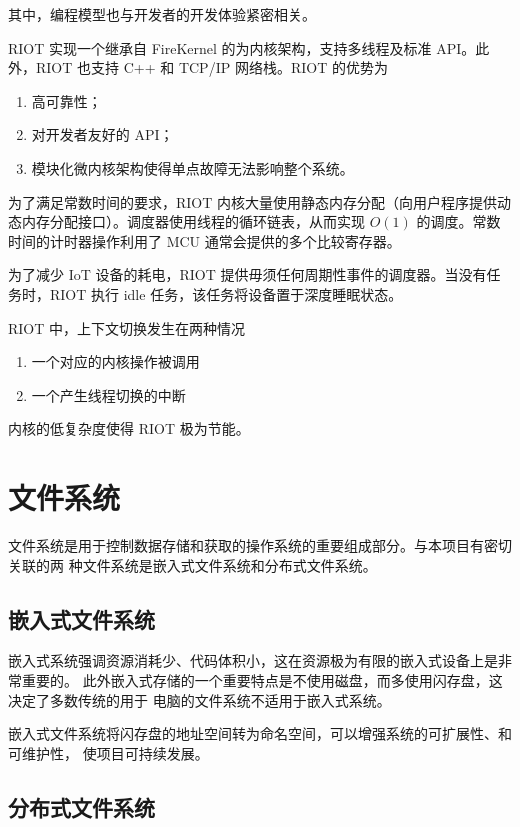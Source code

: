 \documentclass{ctexart}
\begin{document}
其中，编程模型也与开发者的开发体验紧密相关。

RIOT 实现一个继承自 FireKernel 的为内核架构，支持多线程及标准 API。此外，RIOT 也支持 C++ 和 TCP/IP 网络栈。RIOT 的优势为

\begin{enumerate}
	\item 高可靠性；
	\item 对开发者友好的 API；
	\item 模块化微内核架构使得单点故障无法影响整个系统。
\end{enumerate}

为了满足常数时间的要求，RIOT 内核大量使用静态内存分配（向用户程序提供动态内存分配接口）。调度器使用线程的循环链表，从而实现 $O(1)$ 的调度。常数时间的计时器操作利用了 MCU 通常会提供的多个比较寄存器。

为了减少 IoT 设备的耗电，RIOT 提供毋须任何周期性事件的调度器。当没有任务时，RIOT 执行 idle 任务，该任务将设备置于深度睡眠状态。

RIOT 中，上下文切换发生在两种情况
\begin{enumerate}
	\item 一个对应的内核操作被调用
	\item 一个产生线程切换的中断
\end{enumerate}
内核的低复杂度使得 RIOT 极为节能。

\section{文件系统}

文件系统是用于控制数据存储和获取的操作系统的重要组成部分。与本项目有密切关联的两
种文件系统是嵌入式文件系统和分布式文件系统。

\subsection{嵌入式文件系统}

嵌入式系统强调资源消耗少、代码体积小，这在资源极为有限的嵌入式设备上是非常重要的。
此外嵌入式存储的一个重要特点是不使用磁盘，而多使用闪存盘，这决定了多数传统的用于
电脑的文件系统不适用于嵌入式系统。

嵌入式文件系统将闪存盘的地址空间转为命名空间，可以增强系统的可扩展性、和可维护性，
使项目可持续发展。

\subsection{分布式文件系统}
\end{document}
